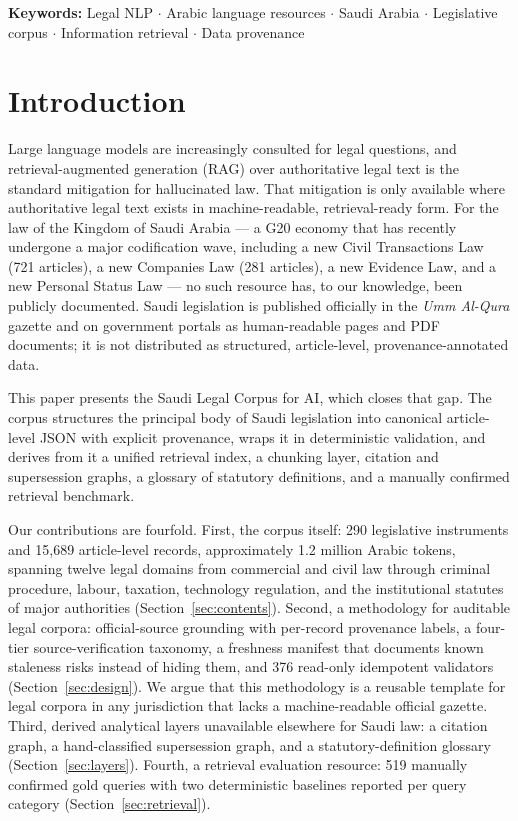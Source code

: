 \documentclass[sn-basic]{sn-jnl}%
\newcommand{\usingsnstyle}{}%
\newcommand{\corpusname}{Saudi Legal Corpus for AI}
\begin{document}
\ifdefined\usingsnstyle
{}
\else
\vspace{1em}\noindent\textbf{Keywords:} Legal NLP $\cdot$ Arabic language
resources $\cdot$ Saudi Arabia $\cdot$ Legislative corpus $\cdot$
Information retrieval $\cdot$ Data provenance
\vspace{1em}
\fi

\section{Introduction}
\label{sec:intro}

Large language models are increasingly consulted for legal questions, and
retrieval-augmented generation (RAG) over authoritative legal text is the
standard mitigation for hallucinated law. That mitigation is only available
where authoritative legal text exists in machine-readable, retrieval-ready
form. For the law of the Kingdom of Saudi Arabia --- a G20 economy that has
recently undergone a major codification wave, including a new Civil
Transactions Law (721 articles), a new Companies Law (281 articles), a new
Evidence Law, and a new Personal Status Law --- no such resource has, to our
knowledge, been publicly documented. Saudi legislation is published
officially in the \emph{Umm Al-Qura} gazette and on government portals as
human-readable pages and PDF documents; it is not distributed as structured,
article-level, provenance-annotated data.

This paper presents the \corpusname, which closes that gap. The corpus
structures the principal body of Saudi legislation into canonical
article-level JSON with explicit provenance, wraps it in deterministic
validation, and derives from it a unified retrieval index, a chunking layer,
citation and supersession graphs, a glossary of statutory definitions, and a
manually confirmed retrieval benchmark.

Our contributions are fourfold. First, the corpus itself: 290 legislative
instruments and 15{,}689 article-level records, approximately 1.2 million
Arabic tokens, spanning twelve legal domains from commercial and civil law
through criminal procedure, labour, taxation, technology regulation, and the
institutional statutes of major authorities (Section~\ref{sec:contents}).
Second, a methodology for auditable legal corpora: official-source grounding
with per-record provenance labels, a four-tier source-verification taxonomy,
a freshness manifest that documents known staleness risks instead of hiding
them, and 376 read-only idempotent validators (Section~\ref{sec:design}). We
argue that this methodology is a reusable template for legal corpora in any
jurisdiction that lacks a machine-readable official gazette. Third, derived
analytical layers unavailable elsewhere for Saudi law: a citation graph, a
hand-classified supersession graph, and a statutory-definition glossary
(Section~\ref{sec:layers}). Fourth, a retrieval evaluation resource: 519
manually confirmed gold queries with two deterministic baselines reported
per query category (Section~\ref{sec:retrieval}).
\end{document}

